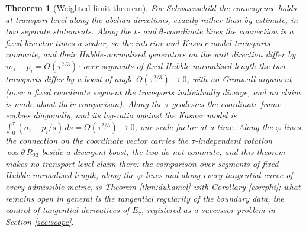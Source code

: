 \documentclass[11pt]{article}
\newtheorem{theorem}{Theorem}[section]
\theoremstyle{definition}
\begin{document}
\begin{theorem}[Weighted limit theorem]
For Schwarzschild the convergence holds at transport level along the abelian directions, exactly rather than by estimate, in two separate statements. Along the $t$- and $\theta$-coordinate lines the connection is a fixed bivector times a scalar, so the interior and Kasner-model transports commute, and their Hubble-normalised generators on the unit direction differ by $\tau\sigma_i - p_i = O(\tau^{2/3})$: over segments of fixed Hubble-normalised length the two transports differ by a boost of angle $O(\tau^{2/3}) \to 0$, with no Gronwall argument (over a fixed \emph{coordinate} segment the transports individually diverge, and no claim is made about their comparison). Along the $\tau$-geodesics the coordinate frame evolves diagonally, and its log-ratio against the Kasner model is $\int_0^\tau (\sigma_i - p_i/s)\,ds = O(\tau^{2/3}) \to 0$, one scale factor at a time. Along the $\varphi$-lines the connection on the coordinate vector carries the $\tau$-independent rotation $\cos\theta\,R_{23}$ beside a divergent boost, the two do not commute, and this theorem makes no transport-level claim there: the comparison over segments of fixed Hubble-normalised length, along the $\varphi$-lines and along every tangential curve of every admissible metric, is Theorem \ref{thm:duhamel} with Corollary \ref{cor:phi}; what remains open in general is the tangential regularity of the boundary data, the control of tangential derivatives of $E_\tau$, registered as a successor problem in Section \ref{sec:scope}.
\end{theorem}
\end{document}
